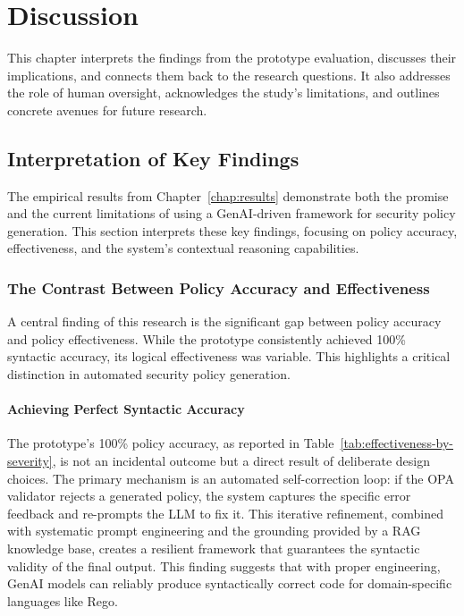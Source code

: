 
\chapter{Discussion}
\label{chap:discussion}

This chapter interprets the findings from the prototype evaluation, discusses their implications, and connects them back to the research questions. It also addresses the role of human oversight, acknowledges the study's limitations, and outlines concrete avenues for future research.

\section{Interpretation of Key Findings}
\label{sec:interpretation}

The empirical results from Chapter~\ref{chap:results} demonstrate both the promise and the current limitations of using a GenAI-driven framework for security policy generation. This section interprets these key findings, focusing on policy accuracy, effectiveness, and the system's contextual reasoning capabilities.

\subsection{The Contrast Between Policy Accuracy and Effectiveness}
A central finding of this research is the significant gap between policy accuracy and policy effectiveness. While the prototype consistently achieved 100\% syntactic accuracy, its logical effectiveness was variable. This highlights a critical distinction in automated security policy generation.

\subsubsection{Achieving Perfect Syntactic Accuracy}
The prototype's 100\% policy accuracy, as reported in Table~\ref{tab:effectiveness-by-severity}, is not an incidental outcome but a direct result of deliberate design choices. The primary mechanism is an automated self-correction loop: if the OPA validator rejects a generated policy, the system captures the specific error feedback and re-prompts the LLM to fix it. This iterative refinement, combined with systematic prompt engineering and the grounding provided by a RAG knowledge base, creates a resilient framework that guarantees the syntactic validity of the final output. This finding suggests that with proper engineering, GenAI models can reliably produce syntactically correct code for domain-specific languages like Rego.

